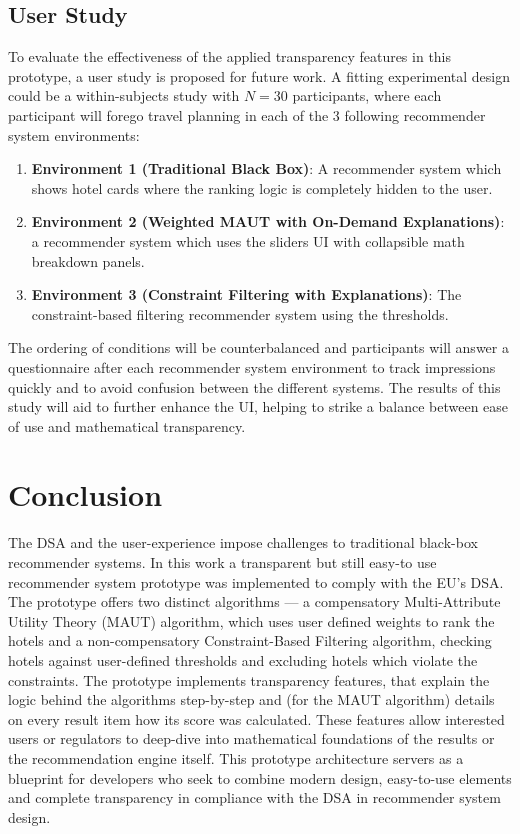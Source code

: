 \documentclass[acmlarge]{acmart}
\begin{document}
\subsection{User Study}
To evaluate the effectiveness of the applied transparency features in this prototype, a user study is proposed for future work. A fitting experimental design could be a within-subjects study with $N=30$ participants, where each participant will forego travel planning in each of the 3 following recommender system environments:
\begin{enumerate}
    \item \textbf{Environment 1 (Traditional Black Box)}: A recommender system which shows hotel cards where the ranking logic is completely hidden to the user.
    \item \textbf{Environment 2 (Weighted MAUT with On-Demand Explanations)}: a recommender system which uses the sliders UI with collapsible math breakdown panels.
    \item \textbf{Environment 3 (Constraint Filtering with Explanations)}: The constraint-based filtering recommender system using the thresholds.
\end{enumerate}
The ordering of conditions will be counterbalanced and participants will answer a questionnaire after each recommender system environment to track impressions quickly and to avoid confusion between the different systems. The results of this study will aid to further enhance the UI, helping to strike a balance between ease of use and mathematical transparency.

\section{Conclusion}\label{sec:conclusion}
The DSA and the user-experience impose challenges to traditional black-box recommender systems. In this work a transparent but still easy-to use recommender system prototype was implemented to comply with the EU's DSA. The prototype offers two distinct algorithms --- a compensatory Multi-Attribute Utility Theory (MAUT) algorithm, which uses user defined weights to rank the hotels and a non-compensatory Constraint-Based Filtering algorithm, checking hotels against user-defined thresholds and excluding hotels which violate the constraints. The prototype implements transparency features, that explain the logic behind the algorithms step-by-step and (for the MAUT algorithm) details on every result item how its score was calculated. These features allow interested users or regulators to deep-dive into mathematical foundations of the results or the recommendation engine itself. This prototype architecture servers as a blueprint for developers who seek to combine modern design,  easy-to-use elements and complete transparency in compliance with the DSA in recommender system design.
\end{document}
